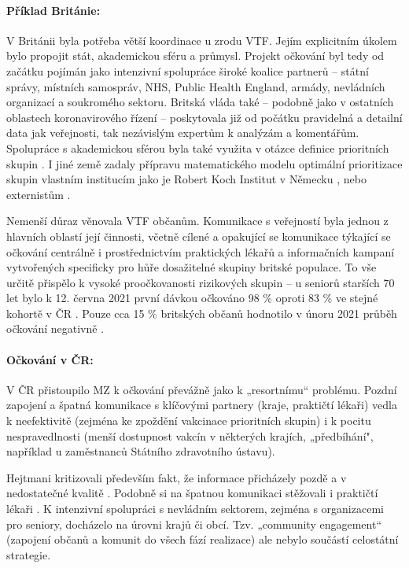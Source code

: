 \paragraph{Příklad Británie:} V Británii byla potřeba větší koordinace u zrodu VTF. Jejím explicitním úkolem bylo propojit stát, akademickou sféru a průmysl. Projekt očkování byl tedy od začátku pojímán jako intenzivní spolupráce široké koalice partnerů -- státní správy, místních samospráv, NHS, Public Health England, armády, nevládních organizací a soukromého sektoru. Britská vláda také – podobně jako v ostatních oblastech koronavirového řízení – poskytovala již od počátku pravidelná a detailní data jak veřejnosti, tak nezávislým expertům k analýzám a komentářům. Spolupráce s akademickou sférou byla také využita v otázce definice prioritních skupin \cite{department_of_health_and_social_care_joint_2020}. I jiné země zadaly přípravu matematického modelu optimální prioritizace skupin vlastním institucím jako je Robert Koch Institut v Německu \cite{rki_rki_2021}, nebo externistům \cite{dooling_phased_2020}.

Nemenší důraz věnovala VTF občanům. Komunikace s veřejností byla jednou z hlavních oblastí její činnosti, včetně cílené a opakující se komunikace týkající se očkování centrálně i prostřednictvím praktických lékařů a informačních kampaní vytvořených specificky pro hůře dosažitelné skupiny britské populace. To vše určitě přispělo k vysoké proočkovanosti rizikových skupin -- u seniorů starších 70 let bylo k 12. června 2021 první dávkou očkováno 98 \%  \cite{nhs_statistics_2021} oproti 83 \% ve stejné kohortě v ČR \cite{noauthor_microsoft_2021}. Pouze cca 15 \% britských občanů hodnotilo v únoru 2021 průběh očkování negativně \cite{skinner_strong_2021}.

\paragraph{Očkování v ČR:} V ČR přistoupilo MZ k očkování převážně jako k „resortnímu“ problému. Pozdní zapojení a špatná komunikace s klíčovými partnery (kraje, praktičtí lékaři) vedla k neefektivitě (zejména ke zpoždění vakcinace prioritních skupin) i k pocitu nespravedlnosti (menší dostupnost vakcín v některých krajích, „předbíhání", například u zaměstnanců Státního zdravotního ústavu).

Hejtmani kritizovali především fakt, že informace přicházely pozdě a v nedostatečné kvalitě \cite{dragoun_hejtmani_2021}. Podobně si na špatnou komunikaci stěžovali i praktičtí lékaři \cite{televize_nevime_2021, prima_delate_2021}. K intenzivní spolupráci s nevládním sektorem, zejména s organizacemi pro seniory, docházelo na úrovni krajů či obcí. Tzv. „community engagement“ (zapojení občanů a komunit do všech fází realizace) ale nebylo součástí celostátní strategie.

